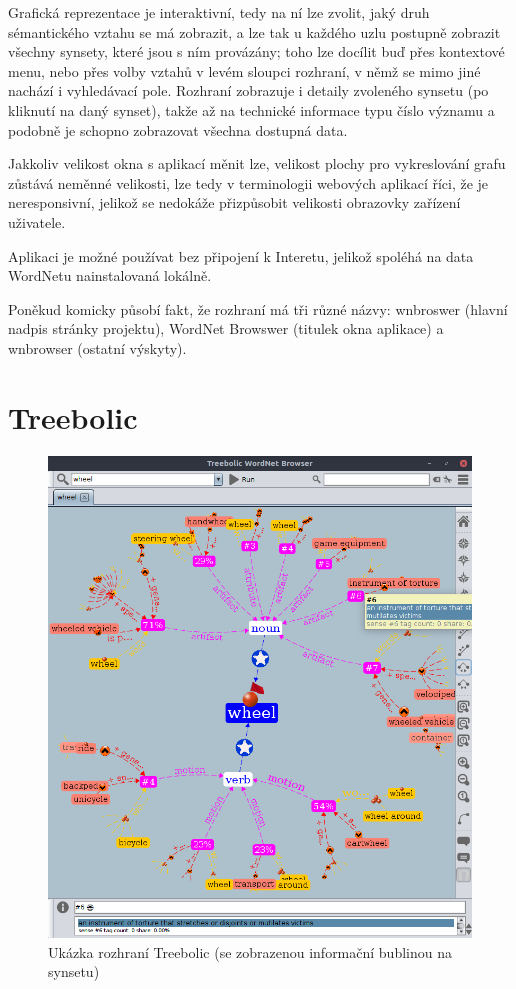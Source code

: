 \documentclass[a4paper, 11pt, oneside]{book}
\begin{document}
				Grafická reprezentace je interaktivní, tedy na ní lze zvolit, jaký druh sémantického vztahu se má zobrazit, a lze tak u každého uzlu postupně zobrazit všechny synsety, které jsou s ním provázány; toho lze docílit buď přes kontextové menu, nebo přes volby vztahů v levém sloupci rozhraní, v němž se mimo jiné nachází i vyhledávací pole. Rozhraní zobrazuje i detaily zvoleného synsetu (po kliknutí na daný synset), takže až na technické informace typu číslo významu a podobně je schopno zobrazovat všechna dostupná data.

				Jakkoliv velikost okna s aplikací měnit lze, velikost plochy pro vykreslování grafu zůstává neměnné velikosti, lze tedy v terminologii webových aplikací říci, že je neresponsivní, jelikož se nedokáže přizpůsobit velikosti obrazovky zařízení uživatele.

				Aplikaci je možné používat bez připojení k Interetu, jelikož spoléhá na data WordNetu nainstalovaná lokálně. 

				Poněkud komicky působí fakt, že rozhraní má tři různé názvy: wnbroswer (hlavní nadpis stránky projektu), WordNet Browswer (titulek okna aplikace) a wnbrowser (ostatní výskyty). 

			\section{Treebolic}

				\begin{figure}[ht]
					\centering
					\includegraphics[width=1.0\textwidth]{wntreebolic.png}
					\caption{Ukázka rozhraní Treebolic (se zobrazenou informační bublinou na synsetu)}
					\label{fig:wntreebolic}
				\end{figure}
\end{document}
